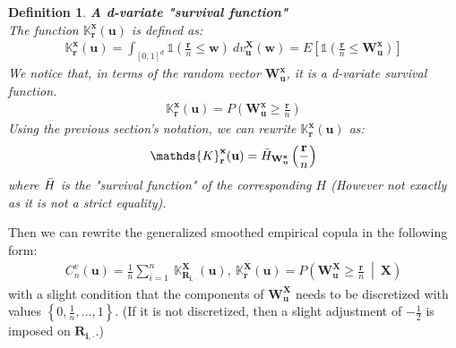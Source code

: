 \documentclass[12pt]{report}
\newtheorem{definition}{Definition}[subsection]
\newcommand{\1}{\mathbf{1}}
\begin{document}
\begin{flushleft}
\begin{definition}\label{K function}
\textit{\normalfont\parencite{KojadinovicYi2024Smooth}}\:
\textbf{A d-variate "survival function"} \\
The function $\mathds{K}_{\textbf{r}}^{\textbf{x}}(\textbf{u})$ is defined as:
\begin{align*}
\mathds{K}_{\textbf{r}}^{\textbf{x}}(\textbf{u}) = \int_{[0,1]^d} \mathds{1}\left(\frac{\textbf{r}}{n} \le \textbf{w}\right) \: dv^{\textbf{X}}_{\textbf{u}}(\textbf{w}) = E \left[ \mathds{1}(\frac{\textbf{r}}{n} \le \textbf{W}^{\textbf{x}}_{\textbf{u}}) \right]
\end{align*}
We notice that, in terms of the random vector $\textbf{W}^{\textbf{x}}_{\textbf{u}}$, it is a d-variate survival function.
\begin{align*}
\mathds{K}_{\textbf{r}}^{\textbf{x}}(\textbf{u}) = P \left( \textbf{W}^{\textbf{x}}_{\textbf{u}} \ge \frac{\textbf{r}}{n} \right)
\end{align*}
Using the previous section's notation, we can rewrite $\mathds{K}_{\textbf{r}}^{\textbf{x}}(\textbf{u})$ as:
\begin{align*}
\mathds{K}_{\textbf{r}}^{\textbf{x}}(\textbf{u}) = \Bar{H}_{\textbf{W}^{\textbf{x}}_{\textbf{u}}}\left(\frac{\textbf{r}}{n}\right)
\end{align*}
where $\Bar{H}$ is the "survival function" of the corresponding $H$ (However not exactly as it is not a strict equality).
\end{definition}
Then we can rewrite the generalized smoothed empirical copula in the following form:
\begin{align*}
C_{n}^{v}(\textbf{u}) = \frac{1}{n} \sum\limits_{i = 1}^{n} \: \mathds{K}_{\mathbf{R_{i,\cdot}}}^{\textbf{X}}(\textbf{u}), \: \mathds{K}_{\textbf{r}}^{\textbf{X}}(\textbf{u}) = P \left( \textbf{W}^{\textbf{X}}_{\textbf{u}} \ge \frac{\textbf{r}}{n} \: \middle| \: \textbf{X} \right)
\end{align*}
with a slight condition that the components of $\textbf{W}^{\textbf{X}}_{\textbf{u}}$ needs to be discretized \parencite{KojadinovicYi2024Smooth} with values $\left\{0,\frac{1}{n}, \dots, 1 \right\}$. (If it is not discretized, then a slight adjustment of $-\frac{1}{2}$ is imposed on $\mathbf{R_{i,\cdot}}$.)


\end{flushleft}
\end{document}
